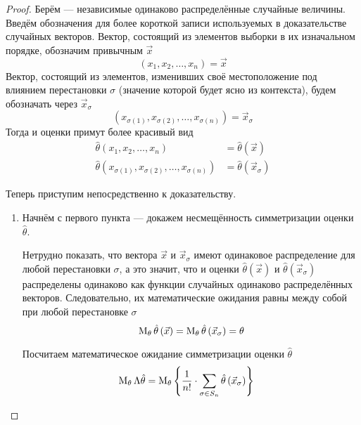 \begin{proof}
  Берём \xsample --- независимые одинаково распределённые
  случайные величины.
  Введём обозначения для более короткой записи
  используемых в доказательстве случайных векторов.
  Вектор, состоящий из элементов выборки в их изначальном порядке,
  обозначим привычным $\vec{x}$
  \begin{equation*}
    \left(x_1, x_2, \dots, x_n\right) = \vec{x}
  \end{equation*}
  Вектор, состоящий из элементов, изменивших своё местоположение под влиянием
  перестановки $\sigma$ (значение которой будет ясно из контекста),
  будем обозначать через $\vec{x}_\sigma$
  \begin{equation*}
    \left(x_{\sigma\left(1\right)}, x_{\sigma\left(2\right)},
      \dots, x_{\sigma\left(n\right)}\right)=\vec{x}_\sigma
  \end{equation*}
  Тогда и оценки примут более красивый вид
  \begin{align*}
      \hat{\theta}\left(x_1, x_2, \dots, x_n\right)
      &= \hat{\theta}\left(\vec{x}\right)\\
      \hat{\theta}\left(x_{\sigma\left(1\right)},
          x_{\sigma\left(2\right)},
          \dots, x_{\sigma\left(n\right)}\right)
      &= \hat{\theta}\left(\vec{x}_\sigma\right)
  \end{align*}

  Теперь приступим непосредственно к доказательству.
  \begin{enumerate}
      \item
      Начнём с первого пункта --- докажем несмещённость
      симметризации оценки $\hat{\theta}$.

      Нетрудно показать, что  вектора $\vec{x}$ и $\vec{x}_\sigma$
      имеют одинаковое распределение для любой перестановки $\sigma$,
      а это значит, что и оценки $\hat{\theta}\left(\vec{x}\right)$
      и $\hat{\theta}\left(\vec{x}_\sigma\right)$
      распределены одинаково как функции случайных
      одинаково распределённых векторов.
      Следовательно, их математические ожидания равны между собой
      при любой перестановке $\sigma$
      $$\operatorname{M}_{\theta} \hat{\theta}\left(\vec{x}\right)
          =\operatorname{M}_{\theta} \hat{\theta}\left(\vec{x}_\sigma\right)
          =\theta$$

      Посчитаем математическое ожидание симметризации оценки
      $\hat{\theta}$
      \begin{align*}
          \operatorname{M}_{\theta} \Lambda\hat{\theta}
        &=\operatorname{M}_{\theta} 
            \left\{\frac{1}{n!}\cdot\sum_{\sigma\in S_n}
            \hat{\theta}\left(\vec{x}_\sigma\right)\right\}
      \end{align*}


\end{enumerate}
\end{proof}
